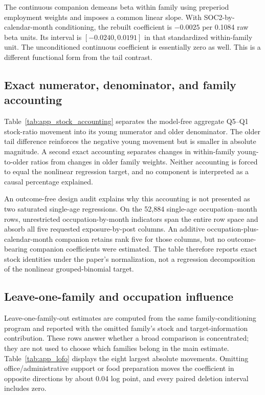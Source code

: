 

The continuous companion demeans beta within family using preperiod employment weights and imposes a common linear slope.  With SOC2-by-calendar-month conditioning, the rebuilt coefficient is $-0.0025$ per 0.1084 raw beta units.  Its interval is $[-0.0240,0.0191]$ in that standardized within-family unit.  The unconditioned continuous coefficient is essentially zero as well.  This is a different functional form from the tail contrast.

\subsection{Exact numerator, denominator, and family accounting}

Table~\ref{tab:app_stock_accounting} separates the model-free aggregate
Q5--Q1 stock-ratio movement into its young numerator and older denominator.
The older tail difference reinforces the negative young movement but is
smaller in absolute magnitude.  A second exact accounting separates changes
in within-family young-to-older ratios from changes in older family weights.
Neither accounting is forced to equal the nonlinear regression target, and no
component is interpreted as a causal percentage explained.



An outcome-free design audit explains why this accounting is not presented as
two saturated single-age regressions.  On the 52,884 single-age
occupation--month rows, unrestricted occupation-by-month indicators span the
entire row space and absorb all five requested exposure-by-post columns.  An
additive occupation-plus-calendar-month companion retains rank five for those
columns, but no outcome-bearing companion coefficients were estimated.  The
table therefore reports exact stock identities under the paper's normalization,
not a regression decomposition of the nonlinear grouped-binomial target.

\subsection{Leave-one-family and occupation influence}

Leave-one-family-out estimates are computed from the same family-conditioning program and reported with the omitted family's stock and target-information contribution.  These rows answer whether a broad comparison is concentrated; they are not used to choose which families belong in the main estimate.  Table~\ref{tab:app_lofo} displays the eight largest absolute movements.  Omitting office/administrative support or food preparation moves the coefficient in opposite directions by about 0.04 log point, and every paired deletion interval includes zero.

